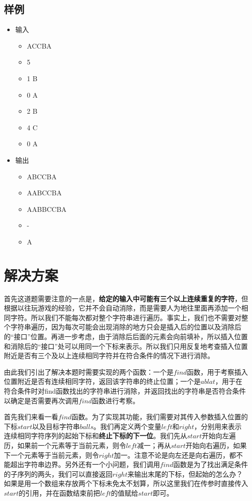 \documentclass[UTF8]{ctexart}
\begin{document}
	\subsection{样例}
	\begin{itemize}
	\item 输入
		\begin{itemize}
			\item[ ]ACCBA
			\item[ ]5
			\item[ ]1 B
			\item[ ]0 A
			\item[ ]2 B
			\item[ ]4 C
			\item[ ]0 A
		\end{itemize}
	\item 输出
		\begin{itemize}
			\item[ ]ABCCBA
			\item[ ]AABCCBA
			\item[ ]AABBCCBA
			\item[ ]-
			\item[ ]A	
		\end{itemize}
	\end{itemize}

	
	\section{解决方案}
	\indent 首先这道题需要注意的一点是，\textbf{给定的输入中可能有三个以上连续重复的字符}，但根据以往玩游戏的经验，它并不会自动消除，而是需要人为地往里面再添加一个相同字符。所以我们不能每次都对整个字符串进行遍历。事实上，我们也不需要对整个字符串遍历，因为每次可能会出现消除的地方只会是插入后的位置以及消除后的“接口”位置。再进一步考虑，由于消除后后面的元素会向前填补，所以插入位置和消除后的“接口”处可以用同一个下标来表示。所以我们只用反复地考查插入位置附近是否有三个及以上连续相同字符并在符合条件的情况下进行消除。
	
	\indent 由此我们引出了解决本题时需要实现的两个函数：一个是$find$函数，用于考察插入位置附近是否有连续相同字符，返回该字符串的终止位置；一个是$ablat$，用于在符合条件时对find函数找出的字符串进行消除，并返回找出的字符串是否符合条件以确定是否需要再次调用$find$函数进行考察。
	
	\indent 首先我们来看一看$find$函数。为了实现其功能，我们需要对其传入参数插入位置的下标$start$以及目标字符串$balls$。我们再定义两个变量$left$和$right$，分别用来表示连续相同字符序列的起始下标和\textbf{终止下标的下一位}。我们先从$start$开始向左遍历，如果前一个元素等于当前元素，则令$left$减一；再从$start$开始向右遍历，如果下一个元素等于当前元素，则令$right$加一。注意不论是向左还是向右遍历，都不能超出字符串边界。另外还有一个小问题，我们调用$find$函数是为了找出满足条件的子序列的两头，我们可以直接返回$right$来输出末尾的下标，但起始的怎么办？如果是用一个数组来存放两个下标未免太不划算，所以这里我们在传参时直接传入$start$的引用，并在函数结束前把$left$的值赋给$start$即可。
	
\end{document}
